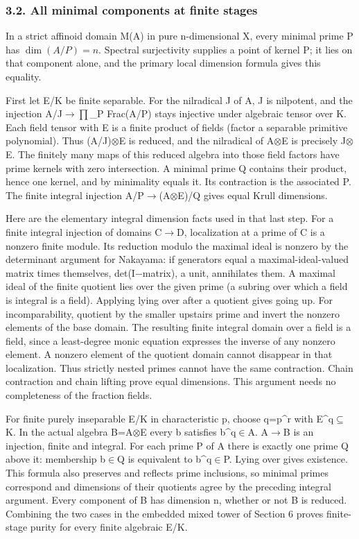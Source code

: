 \documentclass[
  10pt,
]{article}
\begin{document}
\subsubsection{3.2. All minimal components at finite
stages}\label{all-minimal-components-at-finite-stages}

In a strict affinoid domain M(A) in pure n-dimensional X, every minimal
prime P has \(\dim(A/P)=n\). Spectral surjectivity supplies a point of
kernel P; it lies on that component alone, and the primary local
dimension formula gives this equality.

First let E/K be finite separable. For the nilradical J of A, J is
nilpotent, and the injection A/J\ensuremath{\to}\ensuremath{\prod}\_P Frac(A/P) stays injective under
algebraic tensor over K. Each field tensor with E is a finite product of
fields (factor a separable primitive polynomial). Thus (A/J)\ensuremath{\otimes}E is
reduced, and the nilradical of A\ensuremath{\otimes}E is precisely J\ensuremath{\otimes}E. The finitely many
maps of this reduced algebra into those field factors have prime kernels
with zero intersection. A minimal prime Q contains their product, hence
one kernel, and by minimality equals it. Its contraction is the
associated P. The finite integral injection A/P\ensuremath{\to}(A\ensuremath{\otimes}E)/Q gives equal
Krull dimensions.

Here are the elementary integral dimension facts used in that last step.
For a finite integral injection of domains C\ensuremath{\to}D, localization at a prime
of C is a nonzero finite module. Its reduction modulo the maximal ideal
is nonzero by the determinant argument for Nakayama: if generators equal
a maximal-ideal-valued matrix times themselves, det(I\ensuremath{-}matrix), a unit,
annihilates them. A maximal ideal of the finite quotient lies over the
given prime (a subring over which a field is integral is a field).
Applying lying over after a quotient gives going up. For
incomparability, quotient by the smaller upstairs prime and invert the
nonzero elements of the base domain. The resulting finite integral
domain over a field is a field, since a least-degree monic equation
expresses the inverse of any nonzero element. A nonzero element of the
quotient domain cannot disappear in that localization. Thus strictly
nested primes cannot have the same contraction. Chain contraction and
chain lifting prove equal dimensions. This argument needs no
completeness of the fraction fields.

For finite purely inseparable E/K in characteristic p, choose q=p\^{}r
with E\^{}q\ensuremath{\subseteq}K. In the actual algebra B=A\ensuremath{\otimes}E every b satisfies b\^{}q\ensuremath{\in}A.
A\ensuremath{\to}B is an injection, finite and integral. For each prime P of A there is
exactly one prime Q above it: membership b\ensuremath{\in}Q is equivalent to b\^{}q\ensuremath{\in}P.
Lying over gives existence. This formula also preserves and reflects
prime inclusions, so minimal primes correspond and dimensions of their
quotients agree by the preceding integral argument. Every component of B
has dimension n, whether or not B is reduced. Combining the two cases in
the embedded mixed tower of Section 6 proves finite-stage purity for
every finite algebraic E/K.
\end{document}
